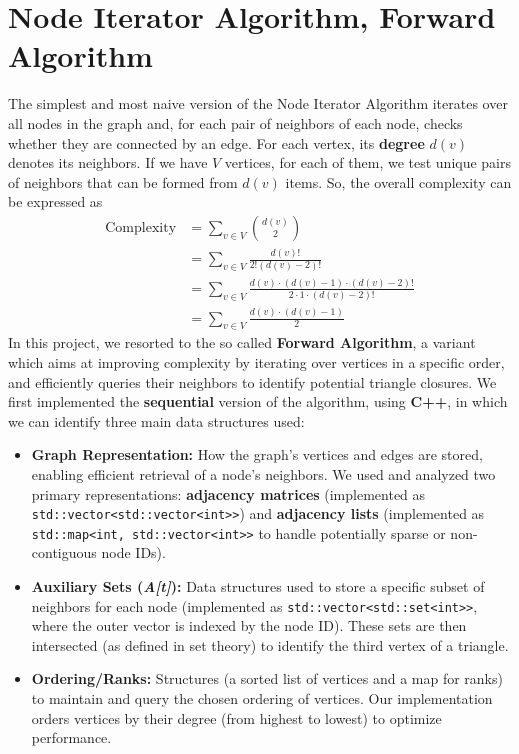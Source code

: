 \documentclass{aes2e}
\begin{document}
\section{Node Iterator Algorithm, Forward Algorithm}
The simplest and most naive version of the Node Iterator Algorithm iterates over all nodes in the graph and, for each pair of neighbors of each node, checks whether they are connected by an edge. For each vertex, its \textbf{degree} $d(v)$ denotes its neighbors. If we have $V$ vertices, for each of them, we test unique pairs of neighbors that can be formed from $d(v)$ items. So, the overall complexity can be expressed as
\begin{align*}
\text{Complexity} &= \sum_{v \in V} \binom{d(v)}{2} \\
&= \sum_{v \in V} \frac{d(v)!}{2!(d(v)-2)!} \\
&= \sum_{v \in V} \frac{d(v) \cdot (d(v)-1) \cdot (d(v)-2)!}{2 \cdot 1 \cdot (d(v)-2)!} \\
&= \sum_{v \in V} \frac{d(v) \cdot (d(v)-1)}{2}
\end{align*}
In this project, we resorted to the so called \textbf{Forward Algorithm}, a variant which aims at improving complexity by iterating over vertices in a specific order, and efficiently queries their neighbors to identify potential triangle closures. We first implemented the \textbf{sequential} version of the algorithm, using \textbf{C++}, in which we can identify three main data structures used:
\begin{itemize}
    \item \textbf{Graph Representation:} How the graph's vertices and edges are stored, enabling efficient retrieval of a node's neighbors. We used and analyzed two primary representations: \textbf{adjacency matrices} (implemented as \texttt{std::vector<std::vector<int>>}) and \textbf{adjacency lists} (implemented as \texttt{std::map<int, std::vector<int>>} to handle potentially sparse or non-contiguous node IDs).
    \item \textbf{Auxiliary Sets (\textit{A[t]}):} Data structures used to store a specific subset of neighbors for each node (implemented as \texttt{std::vector<std::set<int>>}, where the outer vector is indexed by the node ID). These sets are then intersected (as defined in set theory) to identify the third vertex of a triangle.
    \item \textbf{Ordering/Ranks:} Structures (a sorted list of vertices and a map for ranks) to maintain and query the chosen ordering of vertices. Our implementation orders vertices by their degree (from highest to lowest) to optimize performance.
\end{itemize}
\end{document}
